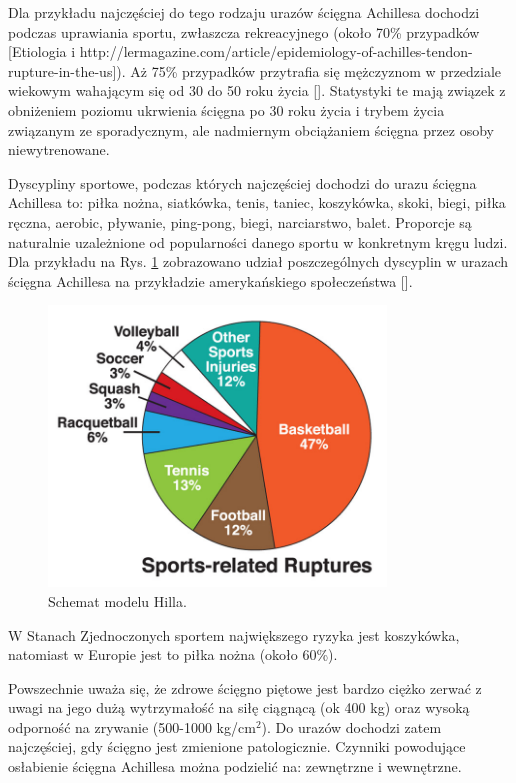 Dla przykładu najczęściej do tego rodzaju urazów ścięgna Achillesa dochodzi podczas uprawiania sportu, zwłaszcza rekreacyjnego (około 70\% przypadków [Etiologia i http://lermagazine.com/article/epidemiology-of-achilles-tendon-rupture-in-the-us]). Aż 75\% przypadków przytrafia się mężczyznom w przedziale wiekowym wahającym się od 30 do 50 roku życia []. Statystyki te mają związek z obniżeniem poziomu ukrwienia ścięgna po 30 roku życia i trybem życia związanym ze sporadycznym, ale nadmiernym obciążaniem ścięgna przez osoby niewytrenowane. 

Dyscypliny sportowe, podczas których najczęściej dochodzi do urazu ścięgna Achillesa to: piłka nożna, siatkówka, tenis, taniec, koszykówka, skoki, biegi, piłka ręczna, aerobic, pływanie, ping-pong, biegi, narciarstwo, balet. Proporcje są naturalnie uzależnione od popularności danego sportu w konkretnym kręgu ludzi. Dla przykładu na Rys. \ref{rupture} zobrazowano udział poszczególnych dyscyplin w urazach ścięgna Achillesa na przykładzie amerykańskiego społeczeństwa []. 

\begin{figure}[h!]
	\centering
	\includegraphics[width=0.8\textwidth]{figures/Achilles_zerwanie.jpg}
	\caption{Schemat modelu Hilla.}
	\label{rupture}
\end{figure}

W Stanach Zjednoczonych sportem największego ryzyka jest koszykówka, natomiast w Europie jest to piłka nożna (około 60\%).  

Powszechnie uważa się, że zdrowe ścięgno piętowe jest bardzo ciężko zerwać z uwagi na jego dużą wytrzymałość na siłę ciągnącą (ok 400 kg) oraz wysoką odporność na zrywanie (500-1000 kg/cm$^2$). Do urazów dochodzi zatem najczęściej, gdy ścięgno jest zmienione patologicznie. Czynniki powodujące osłabienie ścięgna Achillesa można podzielić na: zewnętrzne i wewnętrzne.

